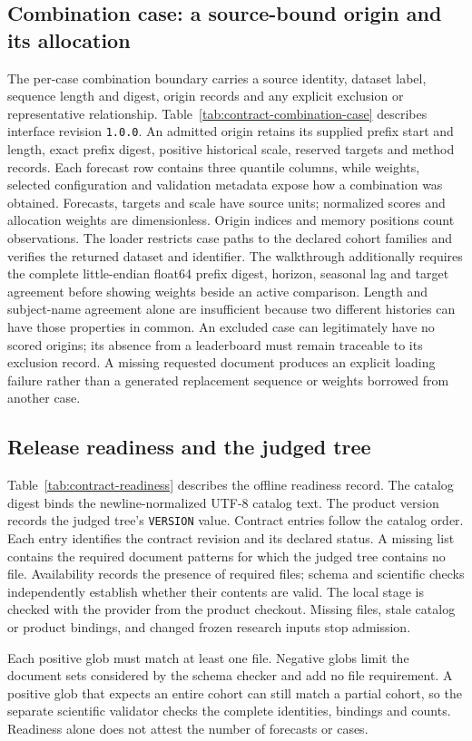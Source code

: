 \subsection{Combination case: a source-bound origin and its allocation}
\label{sec:contract-combination-case}
The per-case combination boundary carries a source identity, dataset label, sequence length and digest, origin records and any explicit exclusion or representative relationship. Table~\ref{tab:contract-combination-case} describes interface revision \texttt{1.0.0}. An admitted origin retains its supplied prefix start and length, exact prefix digest, positive historical scale, reserved targets and method records. Each forecast row contains three quantile columns, while weights, selected configuration and validation metadata expose how a combination was obtained. Forecasts, targets and scale have source units; normalized scores and allocation weights are dimensionless. Origin indices and memory positions count observations. The loader restricts case paths to the declared cohort families and verifies the returned dataset and identifier. The walkthrough additionally requires the complete little-endian float64 prefix digest, horizon, seasonal lag and target agreement before showing weights beside an active comparison. Length and subject-name agreement alone are insufficient because two different histories can have those properties in common. An excluded case can legitimately have no scored origins; its absence from a leaderboard must remain traceable to its exclusion record. A missing requested document produces an explicit loading failure rather than a generated replacement sequence or weights borrowed from another case.


\subsection{Release readiness and the judged tree}
\label{sec:contract-readiness}
Table~\ref{tab:contract-readiness} describes the offline readiness record. The catalog digest binds the newline-normalized UTF-8 catalog text. The product version records the judged tree's \texttt{VERSION} value. Contract entries follow the catalog order. Each entry identifies the contract revision and its declared status. A missing list contains the required document patterns for which the judged tree contains no file. Availability records the presence of required files; schema and scientific checks independently establish whether their contents are valid. The local stage is checked with the provider from the product checkout. Missing files, stale catalog or product bindings, and changed frozen research inputs stop admission.

Each positive glob must match at least one file. Negative globs limit the document sets considered by the schema checker and add no file requirement. A positive glob that expects an entire cohort can still match a partial cohort, so the separate scientific validator checks the complete identities, bindings and counts. Readiness alone does not attest the number of forecasts or cases.

